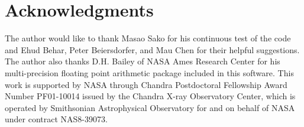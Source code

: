\documentclass{elsart}
\begin{document}
\section*{Acknowledgments}
The author would like to thank Masao Sako for his continuous test of the code
and Ehud Behar, Peter Beiersdorfer, and Mau Chen for their helpful
suggestions. The author also thanks D.H. Bailey 
of NASA Ames Research Center for his multi-precision floating point arithmetic
package included in this software. This work is supported by
NASA through Chandra Postdoctoral Fellowship Award Number PF01-10014 issued by
the Chandra X-ray Observatory Center, which is operated by Smithsonian
Astrophysical Observatory for and on behalf of NASA under contract NAS8-39073.



\end{document}
